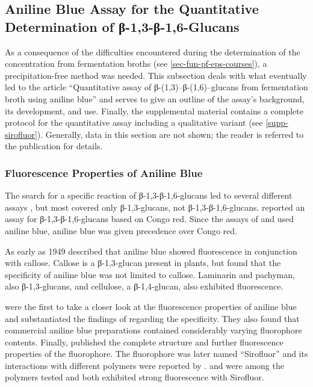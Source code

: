 \subsection{Aniline Blue Assay for the Quantitative Determination of β-1,3-β-1,6-Glucans\label{subsec-fun-pf-sirofluor}}
As a consequence of the difficulties encountered during the determination of the \eps{} concentration from fermentation broths (see \vref{sec-fun-pf-eps-courses}), a precipitation-free method was needed. This subsection deals with what eventually led to the article \enquote{Quantitative assay of β-(1,3)–β-(1,6)–glucans from fermentation broth using aniline blue} \cite{Koenig2017} and serves to give an outline of the assay's background, its development, and use. Finally, the supplemental material contains a complete protocol for the quantitative assay including a qualitative variant (see \vref{supp-sirofluor}). Generally, data in this section are not shown; the reader is referred to the publication for details.

\subsubsection{Fluorescence Properties of Aniline Blue}
The search for a specific reaction of β-1,3-β-1,6-glucans led to several different assays \cite{Ko2004, Shedletzky1997, Nitschke2011, Semedo2015a, Semedo2015b}, but most covered only β-1,3-glucans, not β-1,3-β-1,6-glucans. \textcite{Nitschke2011} reported an assay for β-1,3-β-1,6-glucans based on Congo red. Since the assays of \textcite{Ko2004} and \textcite{Shedletzky1997} used aniline blue, aniline blue was given precedence over Congo red.

As early as 1949 \textcite{Arens1949} described that aniline blue showed fluorescence in conjunction with callose. Callose is a β-1,3-glucan present in plants, but \textcite{Faulkner1973} found that the specificity of aniline blue was not limited to callose. Laminarin and pachyman, also β-1,3-glucans, and cellulose, a β-1,4-glucan, also exhibited fluorescence.

\textcite{Smith1978} were the first to take a closer look at the fluorescence properties of aniline blue and substantiated the findings of \textcite{Faulkner1973} regarding the specificity. They also found that commercial aniline blue preparations contained considerably varying fluorophore contents. Finally, \textcite{Evans1982} published the complete structure and further fluorescence properties of the fluorophore. The fluorophore was later named \enquote{Sirofluor} and its interactions with different polymers were reported by \textcite{Evans1984}. \SCL{} and \shz{} were among the polymers tested and both exhibited strong fluorescence with Sirofluor.

